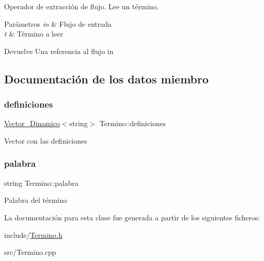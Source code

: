 Operador de extracción de flujo. Lee un término. 


\begin{DoxyParams}{Parámetros}
{\em in} & Flujo de entrada \\
\hline
{\em t} & Término a leer \\
\hline
\end{DoxyParams}
\begin{DoxyReturn}{Devuelve}
Una referencia al flujo in 
\end{DoxyReturn}


\subsection{Documentación de los datos miembro}
\mbox{\label{classTermino_a31558652d55dd5133f846101e6609862}} 
\subsubsection{\texorpdfstring{definiciones}{definiciones}}
{\footnotesize\ttfamily \mbox{\hyperlink{classVector__Dinamico}{Vector\+\_\+\+Dinamico}}$<$string$>$ Termino\+::definiciones\hspace{0.3cm}{\ttfamily [private]}}

Vector con las definiciones \mbox{\label{classTermino_aa55f0db9f49be5bf785a7bf53aedd684}} 
\subsubsection{\texorpdfstring{palabra}{palabra}}
{\footnotesize\ttfamily string Termino\+::palabra\hspace{0.3cm}{\ttfamily [private]}}

Palabra del término 

La documentación para esta clase fue generada a partir de los siguientes ficheros\+:\begin{DoxyCompactItemize}
\item 
include/\mbox{\hyperlink{Termino_8h}{Termino.\+h}}\item 
src/Termino.\+cpp\end{DoxyCompactItemize}
